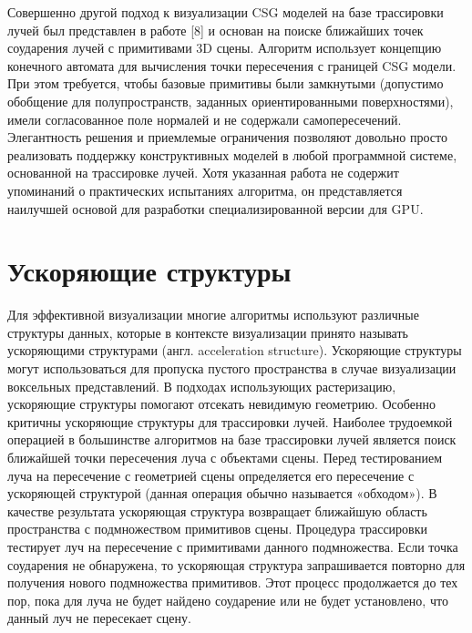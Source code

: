 {{{{Совершенно другой подход к визуализации CSG моделей  на базе трассировки лучей был представлен в работе [8] и основан на поиске ближайших точек соударения лучей с  примитивами 3D сцены. Алгоритм использует концепцию конечного автомата для вычисления точки пересечения с границей CSG модели. При этом требуется, чтобы базовые примитивы были замкнутыми (допустимо обобщение для полупространств, заданных ориентированными поверхностями), имели согласованное поле нормалей и не содержали самопересечений. Элегантность решения и приемлемые ограничения позволяют довольно просто реализовать поддержку конструктивных моделей в любой программной системе, основанной на трассировке лучей. Хотя указанная работа не содержит упоминаний о практических испытаниях алгоритма, он представляется наилучшей основой для разработки специализированной версии для GPU.

\section{Ускоряющие структуры} \label{sect_acceleration_structures}

Для эффективной визуализации многие алгоритмы используют различные структуры данных, которые в контексте визуализации принято называть ускоряющими структурами (англ. acceleration structure). Ускоряющие структуры могут использоваться для пропуска пустого пространства в случае визуализации воксельных представлений. В подходах использующих растеризацию, ускоряющие структуры помогают отсекать невидимую геометрию. Особенно критичны ускоряющие структуры для трассировки лучей. Наиболее трудоемкой операцией в большинстве алгоритмов на базе трассировки лучей является поиск ближайшей точки пересечения луча с объектами сцены. Перед тестированием луча на пересечение с геометрией сцены определяется его пересечение с ускоряющей структурой (данная операция обычно называется «обходом»). В качестве результата ускоряющая структура возвращает ближайшую область пространства с подмножеством примитивов сцены. Процедура трассировки тестирует луч на пересечение с примитивами данного подмножества. Если точка соударения не обнаружена, то ускоряющая структура запрашивается повторно для получения нового подмножества примитивов. Этот процесс продолжается до тех пор, пока для луча не будет найдено соударение или не будет установлено, что данный луч не пересекает сцену.

}}}}
